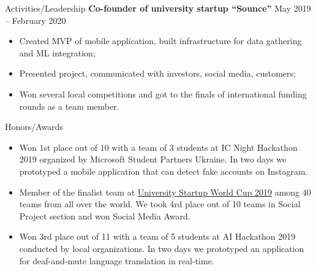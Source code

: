 \documentclass{resume} %
\begin{document}
\begin{rSection}{Activities/Leadership} 
\textbf{Co-founder of university startup ``Sounce''} \hfill May 2019 -- February 2020
\begin{itemize}[topsep=2pt, itemsep=7pt,parsep=-5pt]
    \item Created MVP of mobile application, built infrastructure for data gathering and ML integration;
    \item Presented project, communicated with investors, social media, customers;
    \item Won several local competitions and got to the finals of international funding rounds as a team member.
\end{itemize} 

\end{rSection}
\begin{rSection}{Honors/Awards} 
\begin{itemize}
    \item Won 1st place out of 10 with a team of 3 students at IC Night Hackathon 2019 organized by Microsoft Student Partners Ukraine. In two days we prototyped a mobile application that can detect fake accounts on Instagram.
    \item	Member of the finalist team at  \href{https://venturecup.dk/uswc/}{University Startup World Cup 2019} among 40 teams from all over the world. We took 4rd place out of 10 teams in Social Project section and won Social Media Award.
     \item 	Won 3rd place out of 11  with a team of 5 students at AI Hackathon 2019 conducted by local organizations. In two days we prototyped an application for deaf-and-mute language translation in real-time.
\end{itemize}



\end{rSection}
\end{document}

